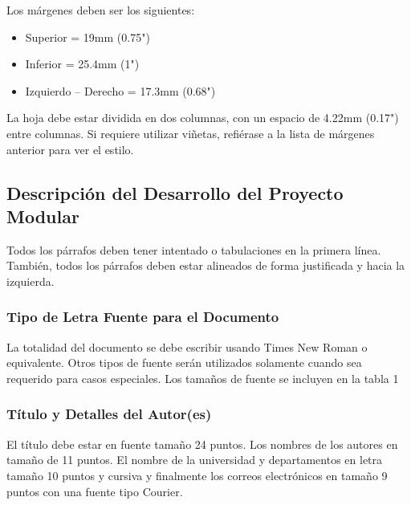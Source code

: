 \documentclass[10pt,twocolumn,letterpaper]{article}
\begin{document}
Los márgenes deben ser los siguientes:

\begin{itemize}
	\item Superior = 19mm (0.75")
	\item Inferior = 25.4mm (1")
	\item Izquierdo – Derecho = 17.3mm (0.68")
\end{itemize}

La hoja debe estar dividida en dos columnas, con un espacio de 4.22mm (0.17") entre columnas.
Si requiere utilizar viñetas, refiérase a la lista de márgenes anterior para ver el estilo.

\subsection{Descripción del Desarrollo del Proyecto Modular}
Todos los párrafos deben tener intentado o tabulaciones en la primera línea. También, todos los párrafos deben estar alineados de forma justificada y hacia la izquierda.

\subsubsection{Tipo de Letra Fuente para el Documento}
La totalidad del documento se debe escribir usando Times New Roman o equivalente. Otros tipos de fuente serán utilizados solamente cuando sea requerido para casos especiales.
Los tamaños de fuente se incluyen en la tabla 1

\subsubsection{Título y Detalles del Autor(es)}
El título debe estar en fuente tamaño 24 puntos. Los nombres de los autores en tamaño de 11 puntos. El nombre de la universidad y departamentos en letra tamaño 10 puntos y cursiva y finalmente los correos electrónicos en tamaño 9 puntos con una fuente tipo Courier.
\end{document}
